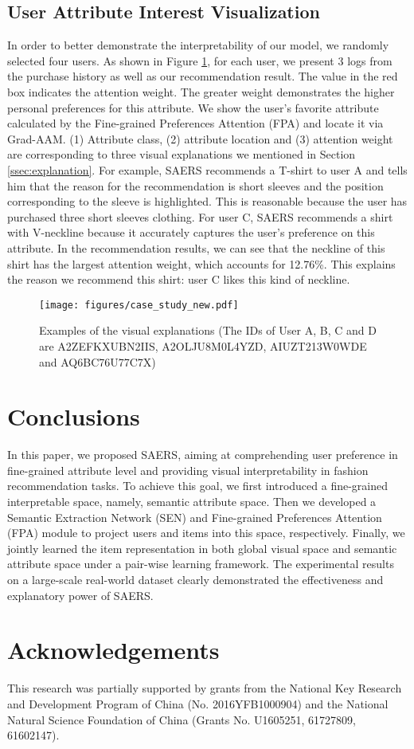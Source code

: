 \documentclass{article}
\begin{document}
\subsection{User Attribute Interest Visualization}
In order to better demonstrate the interpretability of our model, we randomly selected four users. As shown in Figure \ref{fig:case_study}, for each user, we present 3 logs from the purchase history as well as our recommendation result. The value in the red box indicates the attention weight. The greater weight demonstrates the higher personal preferences for this attribute. We show the user's favorite attribute calculated by the Fine-grained Preferences Attention (FPA) and locate it via Grad-AAM.
(1) Attribute class, (2) attribute location and (3) attention weight are corresponding to three visual explanations we mentioned in Section \ref{ssec:explanation}.
For example, SAERS recommends a T-shirt to user A and tells him that the reason for the recommendation is short sleeves and the position corresponding to the sleeve is highlighted. This is reasonable because the user has purchased three short sleeves clothing. For user C, SAERS recommends a shirt with V-neckline because it accurately captures the user's preference on this attribute. In the recommendation results, we can see that the neckline of this shirt has the largest attention weight, which accounts for 12.76\%. This explains the reason we recommend this shirt: user C likes this kind of neckline.


\begin{figure}
\texttt{[image: figures/case\_study\_new.pdf]}\caption{Examples of the visual explanations (The IDs of User A, B, C and D are A2ZEFKXUBN2IIS, A2OLJU8M0L4YZD, AIUZT213W0WDE and AQ6BC76U77C7X)}
\bigskip
\label{fig:case_study} 
\end{figure}


\section{Conclusions}
In this paper, we proposed SAERS, aiming at comprehending user preference in fine-grained attribute level and providing visual interpretability in fashion recommendation tasks. To achieve this goal, we first introduced a fine-grained interpretable space, namely, semantic attribute space. Then we developed a Semantic Extraction Network (SEN) and Fine-grained Preferences Attention (FPA) module to project users and items into this space, respectively. Finally, we jointly learned the item representation in both global visual space and semantic attribute space under a pair-wise learning framework. The experimental results on a large-scale real-world dataset clearly demonstrated the effectiveness and explanatory power of SAERS.

\section*{Acknowledgements}
This research was partially supported by grants from the National Key Research and Development Program of China (No. 2016YFB1000904) and the National Natural Science Foundation of China (Grants No. U1605251, 61727809, 61602147). 



\end{document}
